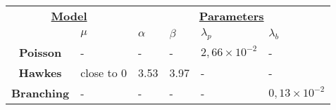 \documentclass{beamer}
\begin{document}
\begin{frame}
\begin{tabular}{cp{1.5cm}p{1.5cm}p{1.5cm}p{1.5cm}p{1.5cm}}
    \multicolumn{2}{c}{\large\textbf{\underline{Model}}}&\multicolumn{4}{c}{\large\textbf{\underline{Parameters}}}\\
    & $\mu$ & $\alpha$ & $\beta$ & $\lambda_p$ & $\lambda_b$ \\ \hline
    \medskip
    \textbf{Poisson} & - & - & - & $2,66\times10^{-2}$ & - \\ \hline 
    \medskip
   \textbf{ Hawkes} & close to 0 & 3.53 & 3.97 & - & - \\ \hline
    \medskip
    \textbf{Branching} & - & - & - & - & $0,13\times10^{-2}$ \\ \hline 
\end{tabular}
\end{frame}
\end{document}
